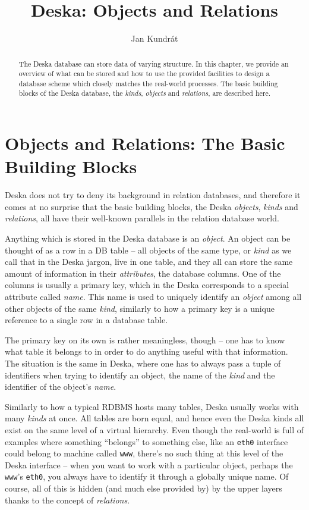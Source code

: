 \documentclass{article}
\begin{document}
\title{Deska: Objects and Relations}

\author{Jan Kundrát}

\maketitle

\newcommand{\deskaFuncRef}[1]{{\tt {#1}}}

\begin{abstract}
The Deska database can store data of varying structure.  In this chapter, we provide an overview of what can be stored
and how to use the provided facilities to design a database scheme which closely matches the real-world processes.  The
basic building blocks of the Deska database, the {\em kinds}, {\em objects} and {\em relations}, are described here.
\end{abstract}

\section{Objects and Relations: The Basic Building Blocks}

Deska does not try to deny its background in relation databases, and therefore it comes at no surprise that the basic
building blocks, the Deska {\em objects}, {\em kinds} and {\em relations}, all have their well-known parallels in the
relation database world.

Anything which is stored in the Deska database is an {\em object}. An object can be thought of as a row in a DB table --
all objects of the same type, or {\em kind} as we call that in the Deska jargon, live in one table, and they all can
store the same amount of information in their {\em attributes}, the database columns.  One of the columns is usually a
primary key, which in the Deska corresponds to a special attribute called {\em name}.  This name is used to uniquely
identify an {\em object} among all other objects of the same {\em kind}, similarly to how a primary key is a unique
reference to a single row in a database table.

The primary key on its own is rather meaningless, though -- one has to know what table it belongs to in order to do
anything useful with that information.  The situation is the same in Deska, where one has to always pass a tuple of
identifiers when trying to identify an object, the name of the {\em kind} and the identifier of the object's {\em name}.

Similarly to how a typical RDBMS hosts many tables, Deska usually works with many {\em kinds} at once.  All tables are
born equal, and hence even the Deska kinds all exist on the same level of a virtual hierarchy.  Even though the
real-world is full of examples where something ``belongs'' to something else, like an {\tt eth0} interface could belong
to machine called {\tt www}, there's no such thing at this level of the Deska interface -- when you want to work with a
particular object, perhaps the {\tt www}'s {\tt eth0}, you always have to identify it through a globally unique name.
Of course, all of this is hidden (and much else provided by) by the upper layers thanks to the concept of {\em
relations}.
\end{document}
